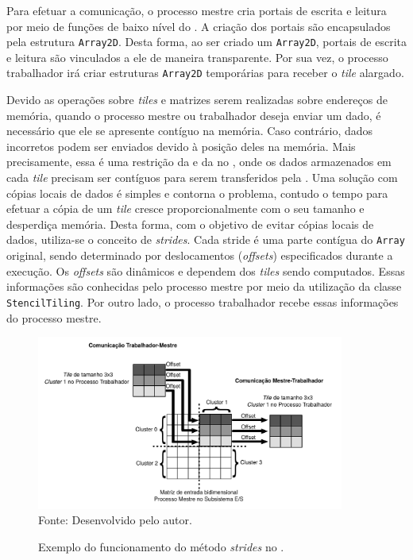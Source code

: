 Para efetuar a comunicação, o processo mestre cria portais de escrita e leitura
por meio de funções de baixo nível do \mppa. A criação dos portais são encapsulados pela
estrutura \texttt{Array2D}. Desta forma, ao ser criado um \texttt{Array2D},
portais de escrita e leitura são vinculados a ele de maneira transparente. Por sua vez, o
processo trabalhador irá criar estruturas \texttt{Array2D} temporárias para
receber o \textit{tile} alargado.

Devido as operações sobre \textit{tiles} e matrizes serem realizadas sobre
endereços de memória, quando o processo mestre ou trabalhador deseja enviar um
dado, é necessário que ele se apresente contíguo na memória. Caso contrário,
dados incorretos podem ser enviados devido à posição deles na memória. Mais
precisamente, essa é uma restrição da \api e da \noc no \mppa, onde os dados
armazenados em cada \textit{tile} precisam ser contíguos para serem transferidos
pela \noc. Uma solução com cópias locais de dados é simples e contorna o
problema, contudo o tempo para efetuar a cópia de um \textit{tile} cresce
proporcionalmente com o seu tamanho e desperdiça memória. Desta forma, com o
objetivo de evitar cópias locais de dados, utiliza-se o conceito de
\textit{strides}. Cada stride é uma parte contígua do \texttt{Array} original,
sendo determinado por deslocamentos (\textit{offsets}) especificados durante a
execução. Os \textit{offsets} são dinâmicos e dependem dos \textit{tiles} sendo
computados. Essas informações são conhecidas pelo processo mestre
por meio da utilização da classe \texttt{StencilTiling}. Por outro lado, o
processo trabalhador recebe essas informações do processo mestre.

\begin{figure}[t]
	\centering
    \caption{Exemplo do funcionamento do método \textit{strides} no \mppa.}
	\includegraphics[width=0.9\textwidth]{figs/stridesImage.pdf} \\
    Fonte: Desenvolvido pelo autor.
	\label{fig:strides}
\end{figure}

